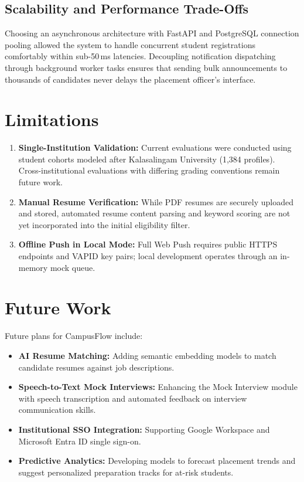\documentclass[conference]{IEEEtran}
\begin{document}
\subsection{Scalability and Performance Trade-Offs}
Choosing an asynchronous architecture with FastAPI and PostgreSQL connection pooling allowed the system to handle concurrent student registrations comfortably within sub-50\,ms latencies. Decoupling notification dispatching through background worker tasks ensures that sending bulk announcements to thousands of candidates never delays the placement officer's interface.

\section{Limitations}
\begin{enumerate}
    \item \textbf{Single-Institution Validation:} Current evaluations were conducted using student cohorts modeled after Kalasalingam University (1,384 profiles). Cross-institutional evaluations with differing grading conventions remain future work.
    \item \textbf{Manual Resume Verification:} While PDF resumes are securely uploaded and stored, automated resume content parsing and keyword scoring are not yet incorporated into the initial eligibility filter.
    \item \textbf{Offline Push in Local Mode:} Full Web Push requires public HTTPS endpoints and VAPID key pairs; local development operates through an in-memory mock queue.
\end{enumerate}

\section{Future Work}
Future plans for CampusFlow include:
\begin{itemize}
    \item \textbf{AI Resume Matching:} Adding semantic embedding models to match candidate resumes against job descriptions.
    \item \textbf{Speech-to-Text Mock Interviews:} Enhancing the Mock Interview module with speech transcription and automated feedback on interview communication skills.
    \item \textbf{Institutional SSO Integration:} Supporting Google Workspace and Microsoft Entra ID single sign-on.
    \item \textbf{Predictive Analytics:} Developing models to forecast placement trends and suggest personalized preparation tracks for at-risk students.
\end{itemize}
\end{document}
